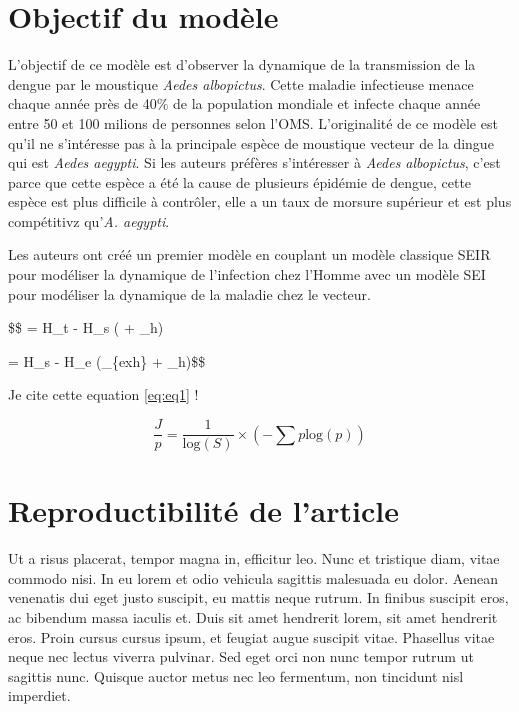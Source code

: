 \hypertarget{objectif-du-moduxe8le}{%
\section{Objectif du modèle}\label{objectif-du-moduxe8le}}

L'objectif de ce modèle est d'observer la dynamique de la transmission
de la dengue par le moustique \emph{Aedes albopictus}. Cette maladie
infectieuse menace chaque année près de 40\% de la population mondiale
et infecte chaque année entre 50 et 100 milions de personnes selon
l'OMS. L'originalité de ce modèle est qu'il ne s'intéresse pas à la
principale espèce de moustique vecteur de la dingue qui est \emph{Aedes
aegypti}. Si les auteurs préfères s'intéresser à \emph{Aedes
albopictus}, c'est parce que cette espèce a été la cause de plusieurs
épidémie de dengue, cette espèce est plus difficile à contrôler, elle a
un taux de morsure supérieur et est plus compétitivz qu'\emph{A.
aegypti}.

Les auteurs ont créé un premier modèle en couplant un modèle classique
SEIR pour modéliser la dynamique de l'infection chez l'Homme avec un
modèle SEI pour modéliser la dynamique de la maladie chez le vecteur.

\$\$  = \lambda H\_t - H\_s \left( +
\mu\_h\right)

 = H\_s  - H\_e (\tau\_\{exh\} +
\mu\_h)\$\$

Je cite cette equation \ref{eq:eq1} !

\begin{equation} \frac{J}{p} = \frac{1}{\text{log}(S)}\times\left(-\sum p \text{log}(p)\right)\label{eq:eq1}\end{equation}

\hypertarget{reproductibilituxe9-de-larticle}{%
\section{Reproductibilité de
l'article}\label{reproductibilituxe9-de-larticle}}

Ut a risus placerat, tempor magna in, efficitur leo. Nunc et tristique
diam, vitae commodo nisi. In eu lorem et odio vehicula sagittis
malesuada eu dolor. Aenean venenatis dui eget justo suscipit, eu mattis
neque rutrum. In finibus suscipit eros, ac bibendum massa iaculis et.
Duis sit amet hendrerit lorem, sit amet hendrerit eros. Proin cursus
cursus ipsum, et feugiat augue suscipit vitae. Phasellus vitae neque nec
lectus viverra pulvinar. Sed eget orci non nunc tempor rutrum ut
sagittis nunc. Quisque auctor metus nec leo fermentum, non tincidunt
nisl imperdiet.

